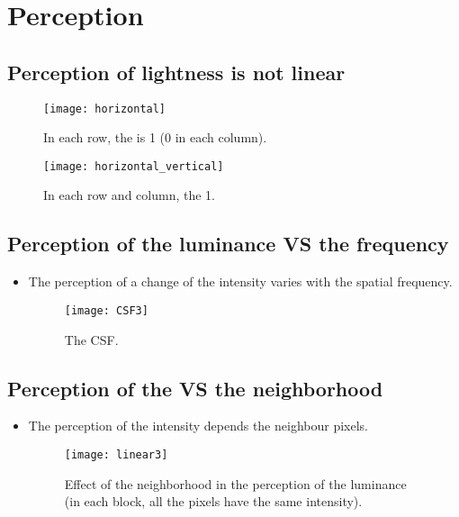 \chapter{Perception}

\section{Perception of lightness \cite{wikipedia_lightness} is not linear}
\begin{figure}[H]
  \centering
  \texttt{[image: horizontal]}
  \caption[Perception of lightness is not linear (1).]{In each row, the  is 1 (0 in each column).}
  \label{fig:HVS_no_linear}
\end{figure}

\begin{figure}[H]
  \centering
  \texttt{[image: horizontal\_vertical]}
  \caption[Perception of lightness is not linear (2).]{In each row and column, the  1.}
  \label{fig:HVS_no_linear}
\end{figure}

\section{Perception of the luminance VS the frequency}
\begin{itemize}
\item The perception of a change of the intensity varies with the spatial frequency.
\begin{figure}[H]
  \centering
  \texttt{[image: CSF3]}
  \caption{The \gls{CSF}.}
  \label{fig:CSF}
\end{figure}
\end{itemize}

\section{Perception of the  VS the neighborhood}
\begin{itemize}
\item The perception of the intensity depends the neighbour pixels.
\begin{figure}[H]
  \centering
  \texttt{[image: linear3]}
  \caption[Effect of the neighborhood in the perception of the luminance (1).]{Effect of the neighborhood in the perception of the luminance (in each block, all the pixels have the same intensity).}
  \label{fig:luminance_vs_neighbor_1}
\end{figure}
\end{itemize}


